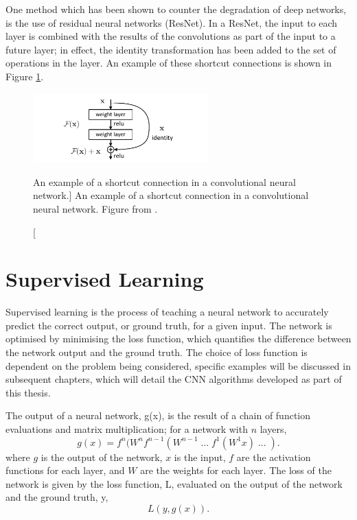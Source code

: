 One method which has been shown to counter the degradation of deep networks, 
is the use of residual neural networks (ResNet). In a ResNet, the input to 
each layer is combined with the results of the convolutions as part of the 
input to a future layer; in effect, the identity transformation has been added
to the set of operations in the layer. An example of these shortcut connections 
is shown in Figure \ref{fig:short_connect}\cite{He_2016_CVPR}. 
\begin{figure}
	\centering
	\includegraphics[width = 0.6\textwidth]{figures/short_connect.pdf}
	\caption
	[An example of a shortcut connection in a convolutional neural network.]
	{An example of a shortcut connection in a convolutional neural network.
	Figure from \cite{He_2016_CVPR}.}
	\label{fig:short_connect}
\end{figure}

\section{Supervised Learning}
Supervised learning is the process of teaching a neural network to accurately
predict the correct output, or ground truth, for a given input. The network is 
optimised by minimising the loss function, which quantifies the difference 
between the network output and the ground truth. The choice of loss function 
is dependent on the problem being considered, specific examples will be 
discussed in subsequent chapters, which will detail the CNN algorithms 
developed as part of this thesis.

The output of a neural network, g(x), is the result of a chain of function 
evaluations and matrix multiplication; for a network with $n$ layers,
\begin{equation*}
	g(x) = f^n(W^n f^{n-1}(W^{n-1} \;...\; f^1(W^1 x) \;...\; ).
\end{equation*}
where $g$ is the output of the network, $x$ is the input, $f$ are the 
activation functions for each layer, and $W$ are the weights for each layer. 
The loss of the network is given by the loss function, L, evaluated on the 
output of the network and the ground truth, y,
\begin{equation*}
	L(y, g(x)).
\end{equation*}

